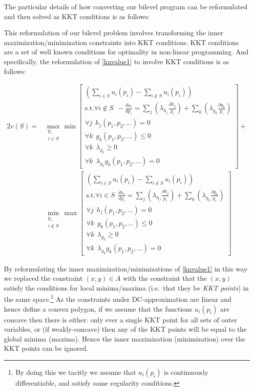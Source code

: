 The particular details of how converting our bilevel program can be reformulated and then solved as KKT conditions is as follows:

This reformulation of our bilevel problem involves transforming the inner maximization/minimization constraints into KKT conditions.
KKT conditions are a set of well known conditions for optimality in non-linear programming.
And specifically, the reformulation of \eqref{knvalue1} to involve KKT conditions is as follows:

\begin{equation}
\label{kkt_optimization1}
\begin{aligned}
2v(S) =& 
\max_{\substack{p_i \\ i\in S}}\min\left[\substack{
	\left(\sum_{i\in S}u_i(p_i) - \sum_{i\notin S}u_i(p_i)\right)\\
	\text{s.t.}\forall i\notin S~~-\frac{d u_i}{d p_i}=\sum_j(\lambda_{h_j}\frac{\partial h_j}{p_i}) + \sum_k(\lambda_{g_k}\frac{\partial g_k}{p_i})\\
	\forall j~~ h_j(p_1,p_2,\dots)=0\\
	\forall k~~ g_k(p_1,p_2,\dots)\le 0\\
	\forall k~~ \lambda_{g_k} \ge 0\\
	\forall k~~ \lambda_{g_k}g_k(p_1,p_2,\dots)= 0}
\right] +\\
&\min_{\substack{p_i \\ i\notin S}}\max\left[\substack{
	\left(\sum_{i\in S}u_i(p_i) - \sum_{i\notin S}u_i(p_i)\right)\\
	\text{s.t.}\forall i\in S~~\frac{d u_i}{d p_i}=\sum_j(\lambda_{h_j}\frac{\partial h_j}{p_i}) + \sum_k(\lambda_{g_k}\frac{\partial g_k}{p_i})\\
	\forall j~~ h_j(p_1,p_2,\dots)=0\\
	\forall k~~ g_k(p_1,p_2,\dots)\le 0\\
	\forall k~~ \lambda_{g_k} \ge 0\\
	\forall k~~ \lambda_{g_k}g_k(p_1,p_2,\dots)= 0}
\right]
\end{aligned}
\end{equation}

By reformulating the inner maximization/minimizations of \eqref{knvalue1} in this way we replaced the constraint $(x,y)\in A$ with 
the constraint that the $(x,y)$ satisfy the conditions for local minima/maxima (i.e.\ that they be \emph{KKT points}) in 
the same space.\footnote{By doing this we tacitly we assume that $u_i(p_i)$ is continuously differentiable, and satisfy some regularity conditions.}
As the constraints under DC-approximation are linear and hence define a convex polygon,
if we assume that the functions $u_i(p_i)$ are concave then there is either: only ever a single KKT point for all sets of outer variables, or (if weakly-concave) then any of the KKT points will be equal to the global minima (maxima).
Hence the inner maximization (minimization) over the KKT points can be ignored.

